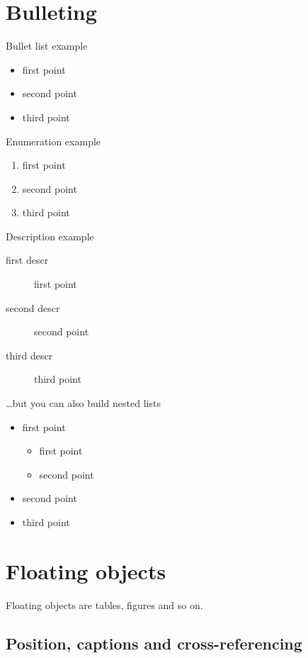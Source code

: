 \section{Bulleting}

Bullet list example
\begin{itemize}
	\item first point
	\item second point
	\item third point \\
\end{itemize}

\noindent
Enumeration example
\begin{enumerate}
	\item first point
	\item second point
	\item third point\\
\end{enumerate}

\noindent
Description example
\begin{description}
	\item[first descr] first point
	\item[second descr]  second point
	\item[third descr]  third point\\
\end{description}

\noindent
\dots but you can also build nested lists
\begin{itemize}
	\item first point
	      \begin{itemize} %
		      \item first point
		      \item second point
	      \end{itemize}
	\item second point
	\item third point \\
\end{itemize}


\section{Floating objects}

Floating objects are tables, figures and so on.

\subsection{Position, captions and cross-referencing}

